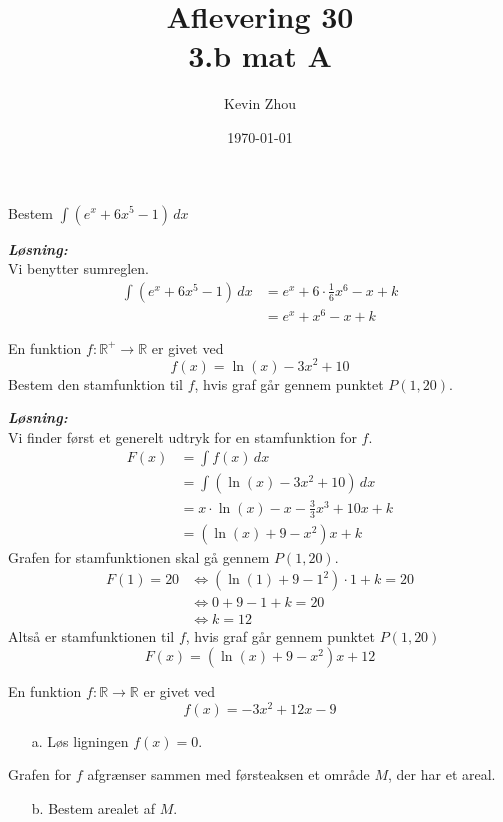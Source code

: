 \documentclass{article}
\title{Aflevering 30\\
{\Large \textbf{3.b mat A}}}
\author{Kevin Zhou}
\date{\today}
\newcommand{\sol}{\setlength{\parindent}{0cm}\textbf{\textit{Løsning:}}\setlength{\parindent}{1cm}}
\begin{document}
\maketitle
\pagebreak
\begin{question}{}{}
  Bestem $\int(e^x + 6x^5 - 1)  \,dx $
\end{question}
\sol \\
Vi benytter sumreglen.
\begin{equation*}
\begin{split}
  \int (e^x + 6x^5 -1) \,dx &= e^x + 6 \cdot \frac{1}{6} x^6 - x +k \\ 
  &=e^x + x^6 -x +k
\end{split}
\end{equation*}
\begin{question}{}{}
  En funktion $f: \mathbb{R}^+ \to \mathbb{R}$ er givet ved
  \[
  f(x)= \ln(x) -3x^2+10
  \] 
  Bestem den stamfunktion til $f$, hvis graf går gennem punktet $P(1,20)$. 
\end{question}
\sol \\
Vi finder først et generelt udtryk for en stamfunktion for $f$.
\begin{equation*}
\begin{split}
  F(x) &= \int f(x) \,dx \\ 
  &=\int (\ln(x)-3x^2+10) \,dx \\ 
  &=x \cdot \ln(x) -x -\frac{3}{3} x^3 +10x +k\\ 
  &=(\ln(x)+9-x^2)x+k
\end{split}
\end{equation*}
Grafen for stamfunktionen skal gå gennem $P(1,20)$.
\begin{equation*}
\begin{split}
  F(1)=20 &\iff (\ln(1)+9-1^2)\cdot 1 + k =20\\ 
  &\iff 0+9-1 + k = 20 \\ 
  &\iff k=12
\end{split}
\end{equation*}
Altså er stamfunktionen til $f$, hvis graf går gennem punktet $P(1,20)$ 
\[
F(x)=(\ln(x)+9-x^2)x+12
\] 
\begin{question}{}{}
 En funktion $f:\mathbb{R}\to \mathbb{R}$ er givet ved
  \[
  f(x)= -3x^2 +12x-9
  \] 
  \begin{itemize}
    \item[a.] Løs ligningen $f(x)=0$.
  \end{itemize}
  Grafen for $f$ afgrænser sammen med førsteaksen et område $M$, der har et areal. 
  \begin{itemize}
    \item[b.] Bestem arealet af $M$.
  \end{itemize}
\end{question}
\end{document}
